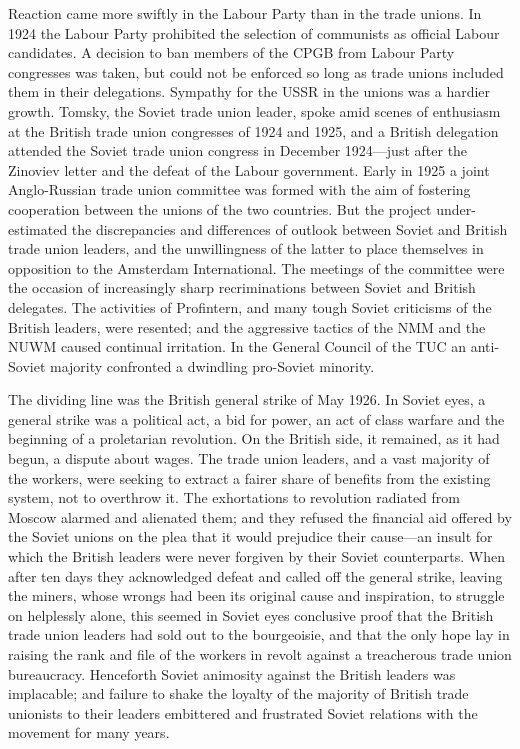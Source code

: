 Reaction came more swiftly in the Labour Party than in the trade unions. In 1924 the Labour Party prohibited the selection of communists as official Labour candidates. A decision to ban members of the CPGB from Labour Party congresses was taken, but could not be enforced so long as trade unions included them in their delegations. Sympathy for the USSR in the unions was a hardier growth. Tomsky, the Soviet trade union leader, spoke amid scenes of enthusiasm at the British trade union congresses of 1924 and 1925, and a British delegation attended the Soviet trade union congress in December 1924---just after the Zinoviev letter and the defeat of the Labour government. Early in 1925 a joint Anglo-Russian trade union committee was formed with the aim of fostering cooperation between the unions of the two countries. But the project under-estimated the discrepancies and differences of outlook between Soviet and British trade union leaders, and the unwillingness of the latter to place themselves in opposition to the Amsterdam International. The meetings of the committee were the occasion of increasingly sharp recriminations between Soviet and British delegates. The activities of Profintern, and many tough Soviet criticisms of the British leaders, were resented; and the aggressive tactics of the NMM and the NUWM caused continual irritation. In the General Council of the TUC an anti-Soviet majority confronted a dwindling pro-Soviet minority. 

The dividing line was the British general strike of May 1926. In Soviet eyes, a general strike was a political act, a bid for power, an act of class warfare and the beginning of a proletarian revolution. On the British side, it remained, as it had begun, a dispute about wages. The trade union leaders, and a vast majority of the workers, were seeking to extract a fairer share of benefits from the existing system, not to overthrow it. The exhortations to revolution radiated from Moscow alarmed and alienated them; and they refused the financial aid offered by the Soviet unions on the plea that it would prejudice their cause---an insult for which the British leaders were never forgiven by their Soviet counterparts. When after ten days they acknowledged defeat and called off the general strike, leaving the miners, whose wrongs had been its original cause and inspiration, to struggle on helplessly alone, this seemed in Soviet eyes conclusive proof that the British trade union leaders had sold out to the bourgeoisie, and that the only hope lay in raising the rank and file of the workers in revolt against a treacherous trade union bureaucracy. Henceforth Soviet animosity against the British leaders was implacable; and failure to shake the loyalty of the majority of British trade unionists to their leaders embittered and frustrated Soviet relations with the movement for many years. 

